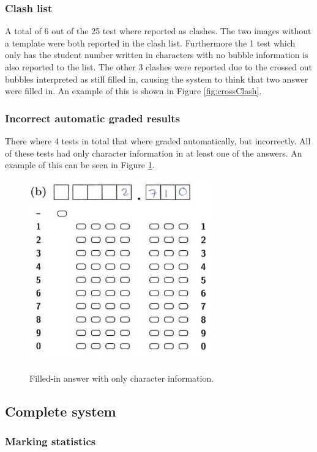 \subsubsection{Clash list}

A total of 6 out of the 25 test where reported as clashes. The two images without a template were both reported in the clash list. Furthermore the 1 test which only has the student number written in characters with no bubble information is also reported to the list. The other 3 clashes were reported due to the crossed out bubbles interpreted as still filled in, causing the system to think that two answer were filled in. An example of this is shown in Figure \ref{fig:crossClash}.

\subsubsection{Incorrect automatic graded results}

There where 4 tests in total that where graded automatically, but incorrectly. All of these tests had only character information in at least one of the answers. An example of this can be seen in Figure \ref{fig:OnlyCharacters}.

\begin{figure}
  \centering
  \includegraphics[width=8cm]{OnlyCharacters}\\
  \caption{Filled-in answer with only character information.}
  \label{fig:OnlyCharacters}
\end{figure}

\subsection{Complete system}

\subsubsection{Marking statistics}

